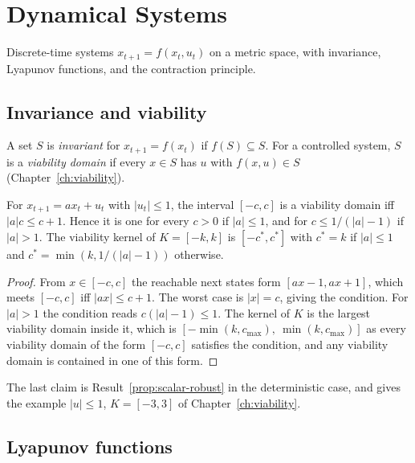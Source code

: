 \chapter{Dynamical Systems}\label{app:dynamics}

Discrete-time systems $x_{t+1}=f(x_t,u_t)$ on a metric space, with invariance, Lyapunov functions, and the contraction principle.

\section{Invariance and viability}

A set $S$ is \emph{invariant} for $x_{t+1}=f(x_t)$ if $f(S)\subseteq S$. For a controlled system, $S$ is a \emph{viability domain} if every $x\in S$ has $u$ with $f(x,u)\in S$ (Chapter~\ref{ch:viability}).

\begin{newresult}\label{d:affine}
For $x_{t+1}=ax_t+u_t$ with $|u_t|\le1$, the interval $[-c,c]$ is a viability domain iff $|a|c\le c+1$. Hence it is one for every $c>0$ if $|a|\le1$, and for $c\le1/(|a|-1)$ if $|a|>1$. The viability kernel of $K=[-k,k]$ is $[-c^*,c^*]$ with $c^*=k$ if $|a|\le1$ and $c^*=\min(k,1/(|a|-1))$ otherwise.
\end{newresult}
\begin{proof}
From $x\in[-c,c]$ the reachable next states form $[ax-1,ax+1]$, which meets $[-c,c]$ iff $|ax|\le c+1$. The worst case is $|x|=c$, giving the condition. For $|a|>1$ the condition reads $c(|a|-1)\le1$. The kernel of $K$ is the largest viability domain inside it, which is $[-\min(k,c_{\max}),\ \min(k,c_{\max})]$ as every viability domain of the form $[-c,c]$ satisfies the condition, and any viability domain is contained in one of this form.
\end{proof}

The last claim is Result~\ref{prop:scalar-robust} in the deterministic case, and gives the example $|u|\le1$, $K=[-3,3]$ of Chapter~\ref{ch:viability}.

\section{Lyapunov functions}

